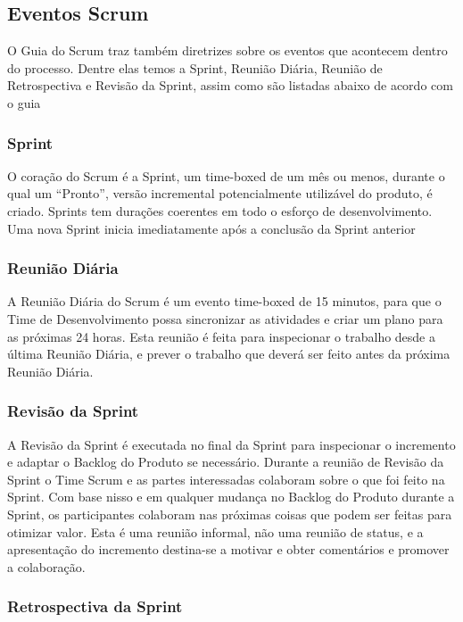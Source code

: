 \subsection{Eventos Scrum}
\label{sub:Eventos Scrum}

O Guia do Scrum \cite{guiaScrum} traz também diretrizes sobre os eventos que acontecem dentro
do processo. Dentre elas temos a Sprint, Reunião Diária, Reunião de Retrospectiva e Revisão da Sprint,
assim como são listadas abaixo de acordo com o guia \cite{guiaScrum}

\subsubsection{Sprint}
\label{subs:Sprint}
O coração do Scrum é a Sprint, um time-boxed de um mês ou menos, durante o qual um
“Pronto”, versão incremental potencialmente utilizável do produto, é criado. Sprints tem
durações coerentes em todo o esforço de desenvolvimento. Uma nova Sprint inicia
imediatamente após a conclusão da Sprint anterior

\subsubsection{Reunião Diária}
\label{subs:Reunião Diária}

A Reunião Diária do Scrum é um evento time-boxed de 15 minutos, para que o Time de
Desenvolvimento possa sincronizar as atividades e criar um plano para as próximas 24 horas.
Esta reunião é feita para inspecionar o trabalho desde a última Reunião Diária, e prever o
trabalho que deverá ser feito antes da próxima Reunião Diária.

\subsubsection{Revisão da Sprint}
\label{subs:Revisão da Sprint}
A Revisão da Sprint é executada no final da Sprint para inspecionar o incremento e adaptar o
Backlog do Produto se necessário. Durante a reunião de Revisão da Sprint o Time Scrum e as
partes interessadas colaboram sobre o que foi feito na Sprint. Com base nisso e em qualquer
mudança no Backlog do Produto durante a Sprint, os participantes colaboram nas próximas
coisas que podem ser feitas para otimizar valor. Esta é uma reunião informal, não uma reunião
de status, e a apresentação do incremento destina-se a motivar e obter comentários e
promover a colaboração.

\subsubsection{Retrospectiva da Sprint}
\label{subs:Retrospectiva da Sprint}

